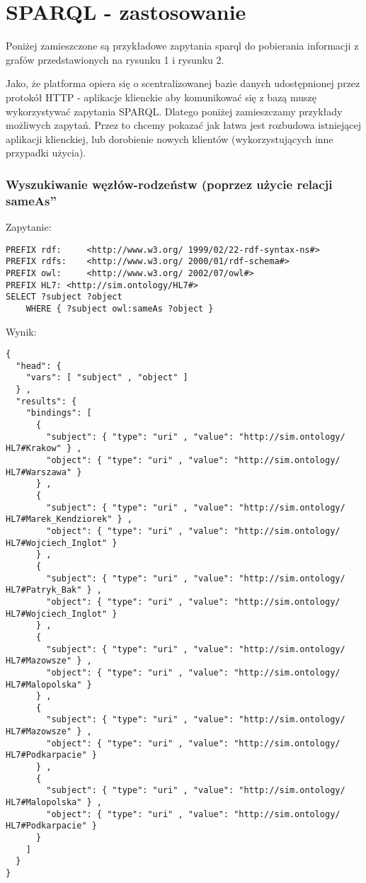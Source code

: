 \section{SPARQL - zastosowanie}
\label{cha:wykorzystanie}

Poniżej zamieszczone są przykładowe zapytania sparql do pobierania informacji z grafów przedstawionych na rysunku 1 i rysunku 2.

Jako, że platforma opiera się o scentralizowanej bazie danych udostępnionej przez protokół HTTP - aplikacje klienckie aby komunikować się z bazą muszę wykorzystywać zapytania SPARQL. Dlatego poniżej zamieszczamy przykłady możliwych zapytań. Przez to chcemy pokazać jak łatwa jest rozbudowa istniejącej aplikacji klienckiej, lub dorobienie nowych klientów (wykorzystujących inne przypadki użycia).

\subsubsection{Wyszukiwanie węzłów-rodzeństw (poprzez użycie \quotedblbase relacji sameAs\textquotedblright }

Zapytanie:
\begin{lstlisting}
PREFIX rdf:     <http://www.w3.org/ 1999/02/22-rdf-syntax-ns#> 
PREFIX rdfs:    <http://www.w3.org/ 2000/01/rdf-schema#>
PREFIX owl:     <http://www.w3.org/ 2002/07/owl#>
PREFIX HL7: <http://sim.ontology/HL7#>
SELECT ?subject ?object
	WHERE { ?subject owl:sameAs ?object }
\end{lstlisting}

Wynik:
\begin{lstlisting}
{
  "head": {
    "vars": [ "subject" , "object" ]
  } ,
  "results": {
    "bindings": [
      {
        "subject": { "type": "uri" , "value": "http://sim.ontology/ HL7#Krakow" } ,
        "object": { "type": "uri" , "value": "http://sim.ontology/ HL7#Warszawa" }
      } ,
      {
        "subject": { "type": "uri" , "value": "http://sim.ontology/ HL7#Marek_Kendziorek" } ,
        "object": { "type": "uri" , "value": "http://sim.ontology/ HL7#Wojciech_Inglot" }
      } ,
      {
        "subject": { "type": "uri" , "value": "http://sim.ontology/ HL7#Patryk_Bak" } ,
        "object": { "type": "uri" , "value": "http://sim.ontology/ HL7#Wojciech_Inglot" }
      } ,
      {
        "subject": { "type": "uri" , "value": "http://sim.ontology/ HL7#Mazowsze" } ,
        "object": { "type": "uri" , "value": "http://sim.ontology/ HL7#Malopolska" }
      } ,
      {
        "subject": { "type": "uri" , "value": "http://sim.ontology/ HL7#Mazowsze" } ,
        "object": { "type": "uri" , "value": "http://sim.ontology/ HL7#Podkarpacie" }
      } ,
      {
        "subject": { "type": "uri" , "value": "http://sim.ontology/ HL7#Malopolska" } ,
        "object": { "type": "uri" , "value": "http://sim.ontology/ HL7#Podkarpacie" }
      }
    ]
  }
}

\end{lstlisting}







